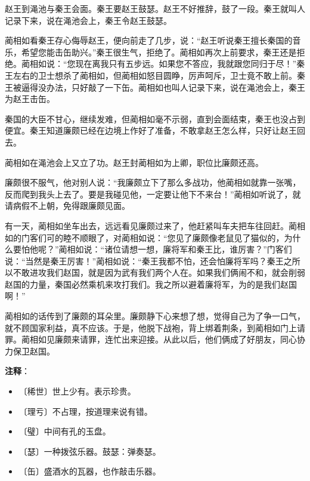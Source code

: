 \documentclass[12pt,UTF-8,openany]{ctexbook}
\begin{document}
\begin{large}
    赵王到渑池与秦王会面。秦王要赵王鼓瑟。赵王不好推辞，鼓了一段。秦王就叫人记录下来，说在渑池会上，秦王令赵王鼓瑟。
    
    蔺相如看秦王存心侮辱赵王，便向前走了几步，说：“赵王听说秦王擅长秦国的音乐，希望您能击缶助兴。”秦王很生气，拒绝了。蔺相如再次上前要求，秦王还是拒绝。蔺相如说：“您现在离我只有五步远。如果您不答应，我就跟您同归于尽！”秦王左右的卫士想杀了蔺相如，但蔺相如怒目圆睁，厉声呵斥，卫士竟不敢上前。秦王被逼得没办法，只好敲了一下缶。蔺相如也叫人记录下来，说在渑池会上，秦王为赵王击缶。
    
    秦国的大臣不甘心，继续发难，但蔺相如毫不示弱，直到会面结束，秦王也没占到便宜。秦王知道廉颇已经在边境上作好了准备，不敢拿赵王怎么样，只好让赵王回去。
    
    蔺相如在渑池会上又立了功。赵王封蔺相如为上卿，职位比廉颇还高。
    
    廉颇很不服气，他对别人说：“我廉颇立下了那么多战功，他蔺相如就靠一张嘴，反而爬到我头上去了。要是我碰见他，一定要让他下不来台！”蔺相如听说了，就请病假不上朝，免得跟廉颇见面。
    
    有一天，蔺相如坐车出去，远远看见廉颇过来了，他赶紧叫车夫把车往回赶。蔺相如的门客们可的睦不顺眼了，对蔺相如说：“您见了廉颇像老鼠见了猫似的，为什么要怕他呢？”蔺相如说：“诸位请想一想，廉将军和秦王比，谁厉害？”门客们说：“当然是秦王厉害！”蔺相如说：“秦王我都不怕，还会怕廉将军吗？秦王之所以不敢进攻我们赵国，就是因为武有我们两个人在。如果我们俩闹不和，就会削弱赵国的力量，秦国必然乘机来攻打我们。我之所以避着廉将军，为的是我们赵国啊！”
    
    蔺相如的话传到了廉颇的耳朵里。廉颇静下心来想了想，觉得自己为了争一口气，就不顾国家利益，真不应该。于是，他脱下战袍，背上绑着荆条，到蔺相如门上请罪。蔺相如见廉颇来请罪，连忙出来迎接。从此以后，他们俩成了好朋友，同心协力保卫赵国。
    
\end{large}


\newpage

\textbf{注释}：

\vspace{-1em}

\begin{itemize}
    \setlength\itemsep{-0.2em}
    \item 〔稀世〕世上少有。表示珍贵。
    \item 〔理亏〕不占理，按道理来说有错。
    \item 〔璧〕中间有孔的玉盘。
    \item 〔瑟〕一种拨弦乐器。鼓瑟：弹奏瑟。
    \item 〔缶〕盛酒水的瓦器，也作敲击乐器。
\end{itemize}
\end{document}
